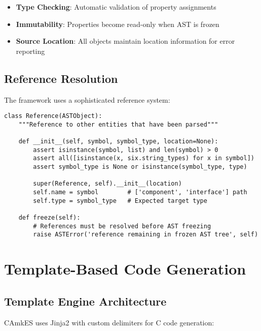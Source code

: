 \documentclass[12pt,a4paper]{article}
\begin{document}
\begin{itemize}
    \item \textbf{Type Checking}: Automatic validation of property assignments
    \item \textbf{Immutability}: Properties become read-only when AST is frozen
    \item \textbf{Source Location}: All objects maintain location information for error reporting
\end{itemize}

\subsection{Reference Resolution}
The framework uses a sophisticated reference system:


\begin{lstlisting}[style=python]
class Reference(ASTObject):
    """Reference to other entities that have been parsed"""
    
    def __init__(self, symbol, symbol_type, location=None):
        assert isinstance(symbol, list) and len(symbol) > 0
        assert all([isinstance(x, six.string_types) for x in symbol])
        assert symbol_type is None or isinstance(symbol_type, type)
        
        super(Reference, self).__init__(location)
        self.name = symbol        # ['component', 'interface'] path
        self.type = symbol_type   # Expected target type
        
    def freeze(self):
        # References must be resolved before AST freezing
        raise ASTError('reference remaining in frozen AST tree', self)
\end{lstlisting}

\section{Template-Based Code Generation}

\subsection{Template Engine Architecture}

CAmkES uses Jinja2 with custom delimiters for C code generation:
\end{document}
